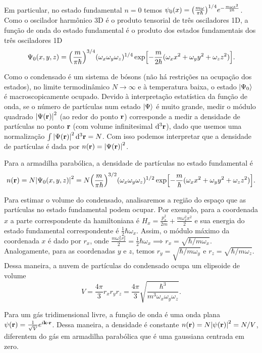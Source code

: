 \documentclass[a4paper,10pt]{article}
\begin{document}
Em particular, no estado fundamental $n = 0$ temos $\psi_0(x) = \qty(\frac{m\omega}{\pi\hbar})^{1/4} e^{-\frac{m\omega x^2}{2\hbar}}$. Como o oscilador harmônico 3D é o produto tensorial de três osciladores 1D, a função de onda do estado fundamental é o produto dos estados fundamentais dos três osciladores 1D
$$
\Psi_0(x,y,z) =
\qty(\frac{m}{\pi\hbar})^{3/4}
(\omega_x \omega_y \omega_z)^{1/4}
\exp[-\frac{m}{2\hbar} (\omega_x x^2 + \omega_y y^2 + \omega_z z^2)].
$$

\n

Como o condensado é um sistema de bósons (não há restrições na ocupação dos estados), no limite termodinâmico $N \to \infty$ e à temperatura baixa, o estado $\ket{\Psi_0}$ é macroscopicamente ocupado. Devido à interpretação estatística da função de onda, se o número de partículas num estado $\ket{\Psi}$ é muito grande, medir o módulo quadrado $\abs{\Psi(\vb{r})}^2$ (ao redor do ponto $\vb{r}$) corresponde a medir a densidade de partículas no ponto $\vb{r}$ (com volume infinitesimal $\dd[3]{\vb{r}}$), dado que usemos uma normalização $\int \abs{\Psi(\vb{r})}^2 \dd[3]{\vb{r}} = N$. Com isso podemos interpretar que a densidade de partículas é dada por $n(\vb{r}) = \abs{\Psi(\vb{r})}^2$.

\n

Para a armadilha parabólica, a densidade de partículas no estado fundamental é
$$
n(\vb{r}) = N \abs{\Psi_0(x,y,z)}^2 =
N\qty(\frac{m}{\pi\hbar})^{3/2}
(\omega_x \omega_y \omega_z)^{1/2}
\exp[-\frac{m}{\hbar} (\omega_x x^2 + \omega_y y^2 + \omega_z z^2)].
$$

\n

Para estimar o volume do condensado, analisaremos a região do espaço que as partículas no estado fundamental podem ocupar. Por exemplo, para a coordenada $x$ a parte correspondente da hamiltoniana é $H_x = \frac{p_x^2}{2m} + \frac{m\omega_x^2 x^2}{2}$ e sua energia do estado fundamental correspondente é $\frac{1}{2} \hbar \omega_x$. Assim, o módulo máximo da coordenada $x$ é dado por $r_x$, onde $\frac{m\omega_x^2 r_x^2}{2} = \frac{1}{2} \hbar \omega_x \implies r_x = \sqrt{\hbar/m\omega_x}$. Analogamente, para as coordenadas $y$ e $z$, temos $r_y = \sqrt{\hbar/m\omega_y}$ e $r_z = \sqrt{\hbar/m\omega_z}$. Dessa maneira, a nuvem de partículas do condensado ocupa um elipsoide de volume
$$
V = \frac{4\pi}{3} r_x r_y r_z = \frac{4\pi}{3} \sqrt{\frac{\hbar^3}{m^3\omega_x\omega_y\omega_z}}.
$$

\n

Para um gás tridimensional livre, a função de onda é uma onda plana $\psi(\r) = \frac{1}{\sqrt{V}} e^{i \k \vdot \r}$. Dessa maneira, a densidade é constante $n(\vb{r}) = N \abs{\psi(\vb{r})}^2 = N/V$, diferentem do gás em armadilha parabólica que é uma gaussiana centrada em zero.
\end{document}
